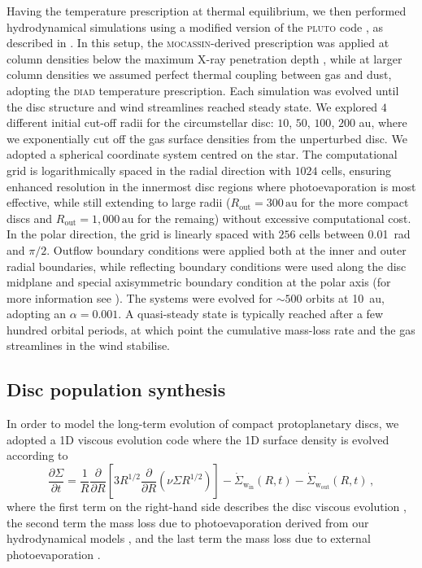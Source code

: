 \documentclass[fleqn,usenatbib]{mnras}
\begin{document}
Having the temperature prescription at thermal equilibrium, we then performed hydrodynamical simulations using a modified version of the \textsc{pluto} code \citep{2007ApJS..170..228M}, as described in \citet{2019MNRAS.487..691P}.
In this setup, the \textsc{mocassin}-derived prescription was applied at column densities below the maximum X-ray penetration depth \citep[\SI{\sim 1e22}{cm^{-2}}, see e.g. Fig.~3 of][]{2009ApJ...699.1639E}, while at larger column densities we assumed perfect thermal coupling between gas and dust, adopting the \textsc{diad} temperature prescription.
Each simulation was evolved until the disc structure and wind streamlines reached steady state.
We explored $4$ different initial cut-off radii for the circumstellar disc: $10$, $50$, $100$, $200$ au, where we exponentially cut off the gas surface densities from the unperturbed disc.
We adopted a spherical coordinate system centred on the star.
The computational grid is logarithmically spaced in the radial direction with $1024$ cells, ensuring enhanced resolution in the innermost disc regions where photoevaporation is most effective, while still extending to large radii ($R_\mathrm{out} = 300\,\mathrm{au}$ for the more compact discs and $R_\mathrm{out} = 1,000\,\mathrm{au}$ for the remaing) without excessive computational cost. In the polar direction, the grid is linearly spaced with $256$ cells between \SI{0.01}{rad} and $\pi/2$.
Outflow boundary conditions were applied both at the inner and outer radial boundaries, while reflecting boundary conditions were used along the disc midplane and special axisymmetric boundary condition at the polar axis (for more information see \citet{2007ApJS..170..228M}).
The systems were evolved for $\sim 500$ orbits at \SI{10}{au}, adopting an $\alpha = 0.001$.
A quasi-steady state is typically reached after a few hundred orbital periods, at which point the cumulative mass-loss rate and the gas streamlines in the wind stabilise.

\subsection{Disc population synthesis}

In order to model the long-term evolution of compact protoplanetary discs, we adopted a 1D viscous evolution code \citep{2015MNRAS.450.3008E} where the 1D surface density is evolved according to
\begin{equation}\label{eq:visc}
\frac{\partial\Sigma}{\partial t} = \frac{1}{R} \frac{\partial}{\partial R} \left[ 3R^{1/2} \frac{\partial}{\partial R} \left( \nu\Sigma R^{1/2} \right)\right] - \dot{\Sigma}_{\mathrm{w_{in}}}(R, t) - \dot{\Sigma}_{\mathrm{w_{out}}}(R, t)\,,
\end{equation}
where the first term on the right-hand side describes the disc viscous evolution \citep{1974MNRAS.168..603L}, the second term the mass loss due to photoevaporation derived from our hydrodynamical models \citep{2021MNRAS.508.3611P}, and the last term the mass loss due to external photoevaporation \citep{2023MNRAS.526.4315H}.
\end{document}
